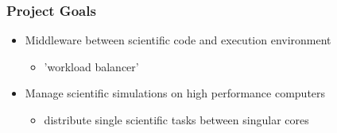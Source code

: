 \begin{frame}
	\frametitle{Project Goals}
		\begin{itemize}
			\pause
			\item {Middleware between scientific code and execution environment}
				\begin{itemize}
					\pause
					\item {'workload balancer'}	
				\end{itemize}
				\pause
				\item {Manage scientific simulations on high performance computers}
				\begin{itemize}
					\pause
					\item {distribute single scientific tasks between singular cores}
				\end{itemize}
			\end{itemize}
\end{frame}
